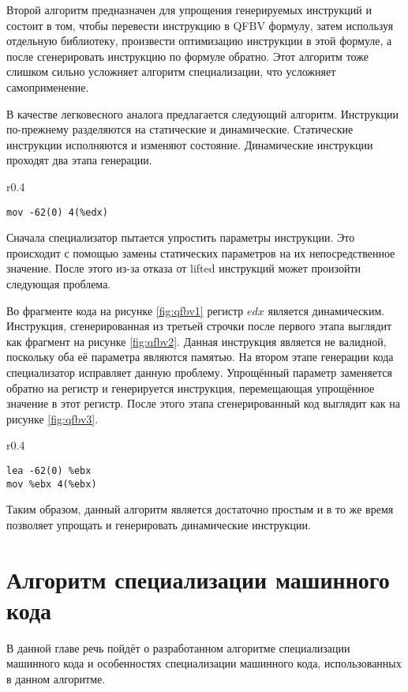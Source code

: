 Второй алгоритм предназначен для упрощения генерируемых инструкций и состоит в том, чтобы перевести инструкцию в QFBV формулу, затем используя отдельную библиотеку, произвести оптимизацию инструкции в этой формуле, а после сгенерировать инструкцию по формуле обратно. Этот алгоритм тоже слишком сильно усложняет алгоритм специализации, что усложняет самоприменение.

В качестве легковесного аналога предлагается следующий алгоритм. Инструкции по-прежнему разделяются на статические и динамические. Статические инструкции исполняются и изменяют состояние. Динамические инструкции проходят два этапа генерации. \begin{wrapfigure}{r}{0.4\textwidth}
\begin{lstlisting}[xleftmargin = 20pt]
mov -62(0) 4(%edx)
\end{lstlisting}
\caption{Фрагмент кода}
\label{fig:qfbv2}
\end{wrapfigure}Сначала специализатор пытается упростить параметры инструкции. Это происходит с помощью замены статических параметров на их непосредственное значение. После этого из-за отказа от lifted инструкций может произойти следующая проблема. 

Во фрагменте кода на рисунке \ref{fig:qfbv1} регистр $edx$ является динамическим. Инструкция, сгенерированная из третьей строчки после первого этапа выглядит как фрагмент на рисунке \ref{fig:qfbv2}. 
Данная инструкция является не валидной, поскольку оба её параметра являются памятью. На втором этапе генерации кода специализатор исправляет данную проблему. Упрощённый параметр заменяется обратно на регистр и генерируется инструкция, перемещающая упрощённое значение в этот регистр. После этого этапа сгенерированный код выглядит как на рисунке \ref{fig:qfbv3}.

\begin{wrapfigure}{r}{0.4\textwidth}
\begin{lstlisting}[xleftmargin = 20pt]
lea -62(0) %ebx 
mov %ebx 4(%ebx)
\end{lstlisting}
\caption{Фрагмент кода}
\label{fig:qfbv3}
\end{wrapfigure}
Таким образом, данный алгоритм является достаточно простым и в то же время позволяет упрощать и генерировать динамические инструкции.

\section{ Алгоритм специализации машинного кода}
В данной главе речь пойдёт о разработанном алгоритме специализации машинного кода и особенностях специализации машинного кода, использованных в данном алгоритме.

